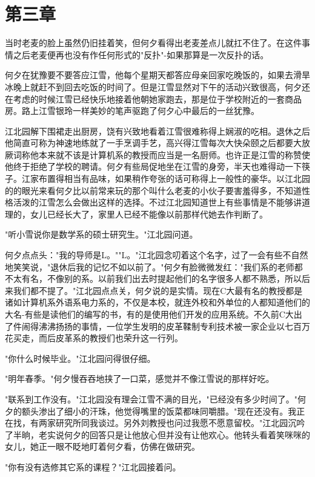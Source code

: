 \documentclass[UTF8]{ctexart}
\begin{document}
\clearpage

\section*{第三章}
当时老麦的脸上虽然仍旧挂着笑，但何夕看得出老麦差点儿就扛不住了。在这件事情之后老麦便再也没有作任何形式的"反扑"-如果那算是一次反扑的话。

何夕在犹豫要不要答应江雪，他每个星期天都答应母亲回家吃晚饭的，如果去滑旱冰晚上就赶不到回去吃饭的时间了。但是江雪显然对下午的活动兴致很高，何夕还在考虑的时候江雪已经快乐地接着他朝她家跑去，那是位于学校附近的一套商品房。路上江雪银玲一样美妙的笔声驱跑了何夕心中最后的一丝犹豫。

江北园解下围裙走出厨房，饶有兴致地看着江雪很难称得上娴淑的吃相。退休之后他简直可称为神速地练就了一手烹调手艺，高兴得江雪每次大快朵颐之后都要大放厥词称他本来就不该是计算机系的教授而应当是一名厨师。也许正是江雪的称赞使他终于拒绝了学校的聘请。何夕有些局促地坐在江雪的身旁，半天也难得动一下筷子。江家布置得相当有品味，如果稍作夸张的话可称得上一般性的豪华。以江北园的的眼光来看何夕比以前常来玩的那个叫什么老麦的小伙子要害羞得多，不知道性格活泼的江雪怎么会做出这样的选择。不过江北园知道世上有些事情是不能够讲道理的，女儿已经长大了，家里人已经不能像以前那样代她去作判断了。

"听小雪说你是数学系的硕士研究生。"江北园问道。

何夕点点头："我的导师是L。""L。"江北园念叨着这个名字，过了一会有些不自然地笑笑说，"退休后我的记忆不如以前了。"何夕有脸微微发红："我们系的老师都不太有名，不像别的系。以前我们出去时提起他们的名字很多人都不熟悉，所以后来我们都不提了。"江北园点点关，何夕说的是实情。现在C大最有名的教授都是诸如计算机系外语系电力系的，不仅是本校，就连外校和外单位的人都知道他们的大名-有些是读他们的编写的书，有的是使用他们开发的应用系统。不久前C大出了件闹得沸沸扬扬的事情，一位学生发明的皮革鞣制专利技术被一家企业以七百万花买走，而后皮革系的教授们也荣升这一行列。

"你什么时候毕业。"江北园问得很仔细。

"明年春季。"何夕慢吞吞地挟了一口菜，感觉并不像江雪说的那样好吃。

"联系到工作没有。"江北园没有理会江雪不满的目光，"已经没有多少时间了。"何夕的额头渗出了细小的汗珠，他觉得嘴里的饭菜都味同嚼腊。"现在还没有。我正在找，有两家研究所同我谈过。另外刘教授也问过我愿不愿意留校。"江北园沉吟了半晌，老实说何夕的回答只是让他放心但并没有让他欢心。他转头看着笑咪咪的女儿，她正一眼不眨地盯着何夕看，仿佛在做研究。

"你有没有选修其它系的课程？"江北园接着问。
\end{document}
